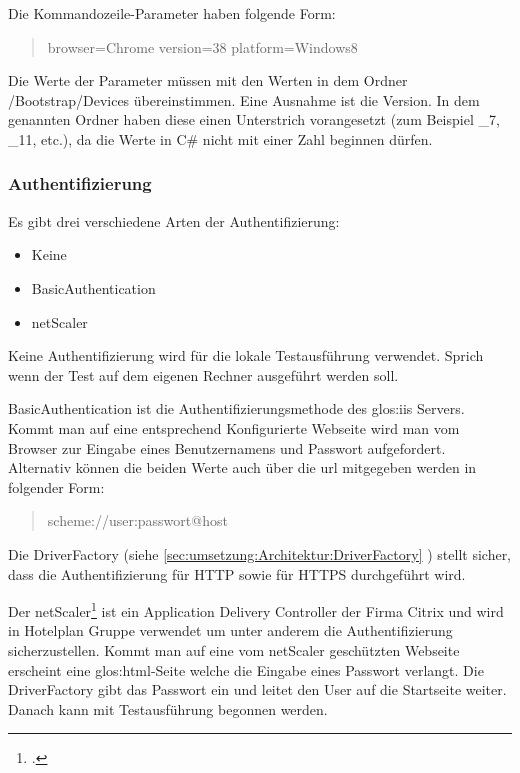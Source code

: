 Die Kommandozeile-Parameter haben folgende Form:
\begin{quote}
browser=Chrome version=38 platform=Windows8
\end{quote}
Die Werte der Parameter müssen mit den Werten in dem Ordner /Bootstrap/Devices übereinstimmen. Eine Ausnahme ist die Version. In dem genannten Ordner haben diese einen Unterstrich vorangesetzt (zum Beispiel \_7, \_11, etc.), da die Werte in C\# nicht mit einer Zahl beginnen dürfen.

\subsubsection{Authentifizierung}
\label{sec:umsetzung:architektur:bootstrap:Authentifizierung}
Es gibt drei verschiedene Arten der Authentifizierung:
\begin{itemize}
\item Keine
\item BasicAuthentication
\item netScaler
\end{itemize}

Keine Authentifizierung wird für die lokale Testausführung verwendet. Sprich wenn der Test auf dem eigenen Rechner ausgeführt werden soll.

BasicAuthentication ist die Authentifizierungsmethode des \Gls{glos:iis} Servers. Kommt man auf eine entsprechend Konfigurierte Webseite wird man vom Browser zur Eingabe eines Benutzernamens und Passwort aufgefordert. Alternativ können die beiden Werte auch über die \gls{url} mitgegeben werden in folgender Form:
\begin{quote}
	scheme://user:passwort@host
\end{quote}
Die DriverFactory (siehe \cref{sec:umsetzung:Architektur:DriverFactory} ) stellt sicher, dass die Authentifizierung für HTTP sowie für HTTPS durchgeführt wird.

Der netScaler\footcite{NetScaler} ist ein Application Delivery Controller der Firma Citrix und wird in Hotelplan Gruppe verwendet um unter anderem die Authentifizierung sicherzustellen. Kommt man auf eine vom netScaler geschützten Webseite erscheint eine \Gls{glos:html}-Seite welche die Eingabe eines Passwort verlangt. Die DriverFactory gibt das Passwort ein und leitet den User auf die Startseite weiter. Danach kann mit Testausführung begonnen werden.

